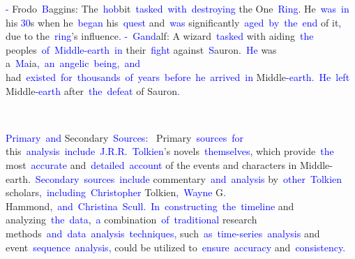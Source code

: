 \documentclass{article}
\begin{document}
\begin{tcolorbox}[colframe=black,colback=white]
{}\textcolor{blue}{-} Frodo\textcolor{blue}{~B}aggins: The\textcolor{blue}{~hob}bit\textcolor{blue}{~tasked}\textcolor{blue}{~with}\textcolor{blue}{~destroying} the One\textcolor{blue}{~Ring}. He\textcolor{blue}{~was}\textcolor{blue}{~in} his \textcolor{blue}{30}s when he\textcolor{blue}{~began} his\textcolor{blue}{~quest} and\textcolor{blue}{~was} significantly\textcolor{blue}{~aged}\textcolor{blue}{~by}\textcolor{blue}{~the}\textcolor{blue}{~end} of it\textcolor{blue}{,} due to the\textcolor{blue}{~ring}'s influence\textcolor{blue}{.
}\textcolor{blue}{-}\textcolor{blue}{~Gand}alf: A wizard\textcolor{blue}{~tasked} with aiding\textcolor{blue}{~the} peoples\textcolor{blue}{~of}\textcolor{blue}{~Middle}\textcolor{blue}{-earth}\textcolor{blue}{~in} their\textcolor{blue}{~fight} against\textcolor{blue}{~S}auron.\textcolor{blue}{~He} was a\textcolor{blue}{~Ma}ia\textcolor{blue}{,}\textcolor{blue}{~an}\textcolor{blue}{~angel}\textcolor{blue}{ic}\textcolor{blue}{~being}\textcolor{blue}{,}\textcolor{blue}{~and} had\textcolor{blue}{~existed}\textcolor{blue}{~for}\textcolor{blue}{~thousands}\textcolor{blue}{~of}\textcolor{blue}{~years}\textcolor{blue}{~before}\textcolor{blue}{~he}\textcolor{blue}{~arrived}\textcolor{blue}{~in} Middle\textcolor{blue}{-earth}\textcolor{blue}{.}\textcolor{blue}{~He}\textcolor{blue}{~left} Middle\textcolor{blue}{-earth} after\textcolor{blue}{~the}\textcolor{blue}{~defeat} of Sauron\textcolor{blue}{.}\textcolor{blue}{~

}\textcolor{blue}{Primary}\textcolor{blue}{~and} Secondary\textcolor{blue}{~Sources}\textcolor{blue}{:}\textcolor{blue}{~
}Primary\textcolor{blue}{~sources}\textcolor{blue}{~for} this\textcolor{blue}{~analysis}\textcolor{blue}{~include}\textcolor{blue}{~J}\textcolor{blue}{.R}\textcolor{blue}{.R}\textcolor{blue}{.}\textcolor{blue}{~Tolkien}'s novels\textcolor{blue}{~themselves}, which provide\textcolor{blue}{~the} most\textcolor{blue}{~accurate} and\textcolor{blue}{~detailed}\textcolor{blue}{~account} of the events and characters in Middle-earth\textcolor{blue}{.}\textcolor{blue}{~Secondary}\textcolor{blue}{~sources}\textcolor{blue}{~include} commentary\textcolor{blue}{~and}\textcolor{blue}{~analysis} by\textcolor{blue}{~other}\textcolor{blue}{~Tolkien} scholars\textcolor{blue}{,}\textcolor{blue}{~including}\textcolor{blue}{~Christopher} Tolkien\textcolor{blue}{,}\textcolor{blue}{~Wayne} G\textcolor{blue}{.} Hammond,\textcolor{blue}{~and}\textcolor{blue}{~Christina}\textcolor{blue}{~Sc}\textcolor{blue}{ull}\textcolor{blue}{.}\textcolor{blue}{~In}\textcolor{blue}{~constructing}\textcolor{blue}{~the}\textcolor{blue}{~timeline} and analyzing\textcolor{blue}{~the}\textcolor{blue}{~data},\textcolor{blue}{~a} combination\textcolor{blue}{~of}\textcolor{blue}{~traditional} research methods\textcolor{blue}{~and}\textcolor{blue}{~data}\textcolor{blue}{~analysis}\textcolor{blue}{~techniques}\textcolor{blue}{,} such\textcolor{blue}{~as}\textcolor{blue}{~time}\textcolor{blue}{-series}\textcolor{blue}{~analysis} and event\textcolor{blue}{~sequence}\textcolor{blue}{~analysis}\textcolor{blue}{,} could be utilized to\textcolor{blue}{~ensure}\textcolor{blue}{~accuracy} and\textcolor{blue}{~consistency}\textcolor{blue}{.}\textcolor{blue}{}
\end{tcolorbox}
\end{document}
